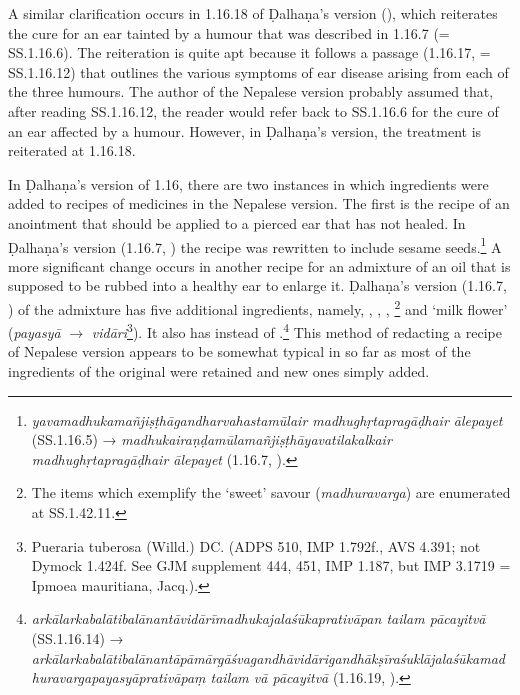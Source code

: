 A similar clarification occurs in 1.16.18 of Ḍalhaṇa's version (\cite[79]{vulgate}), which reiterates the cure for an ear tainted by a humour that was described in 1.16.7 (= SS.1.16.6). The reiteration is quite apt because it follows a passage  (1.16.17, \cite[79]{vulgate} = SS.1.16.12) that outlines the various symptoms of ear disease arising from each of the three humours. The author of the Nepalese version probably assumed that, after reading SS.1.16.12, the reader would refer back to SS.1.16.6 for the cure of an ear affected by a humour. However, in Ḍalhaṇa's version, the treatment is reiterated at 1.16.18.

In  Ḍalhaṇa's version of 1.16, there are two instances in which ingredients were added to recipes of medicines in the Nepalese version. The first is the recipe of an anointment that should be applied to a pierced ear that has not healed. In Ḍalhaṇa's version (1.16.7, \cite[77]{vulgate}) the recipe was rewritten to include sesame seeds.\footnote{\emph{yavamadhukamañjiṣṭhāgandharvahastamūlair madhughṛtapragāḍhair ālepayet} (SS.1.16.5) → \emph{madhukairaṇḍamūlamañjiṣṭhāyavatilakalkair madhughṛtapragāḍhair ālepayet} (1.16.7, \cite[77]{vulgate}).} A more significant change occurs in another recipe for an admixture of an oil that is supposed to be rubbed into a healthy ear to enlarge it. Ḍalhaṇa's version (1.16.7, \cite[77]{vulgate}) of the admixture has five additional ingredients, namely, , , , \footnote{The items which exemplify the `sweet' savour \label{kakolyadi} (\emph{madhuravarga}) are enumerated at SS.1.42.11.} and `milk flower' (\emph{payasyā}  $\rightarrow$ \emph{vidāri}\footnote{Pueraria tuberosa (Willd.) DC. (ADPS 510, IMP 1.792f., AVS 4.391; not Dymock 1.424f. See GJM supplement 444, 451, IMP 1.187, but IMP 3.1719 = Ipmoea mauritiana, Jacq.). }). It also has  instead of .\footnote{\emph{arkālarkabalātibalānantāvidārīmadhukajalaśūkaprativāpan tailam pācayitvā } (SS.1.16.14) → \emph{arkālarkabalātibalānantāpāmārgāśvagandhāvidārigandhākṣīraśuklājalaśūkamadhuravargapayasyāprativāpaṃ tailam vā pācayitvā} (1.16.19, \cite[79]{vulgate}).} This method of redacting a recipe of Nepalese version appears to be somewhat typical in so far as most of the ingredients of the original were retained and new ones simply added. 


